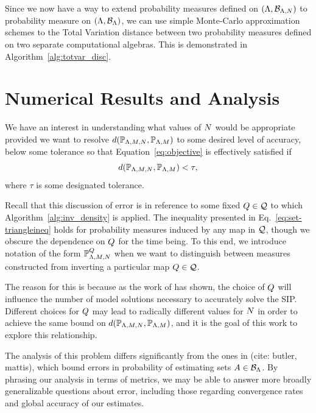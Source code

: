 Since we now have a way to extend probability measures defined on $({\Lambda}, \mathcal{B}_{{\Lambda}, N})$ to  probability measure on $({\Lambda}, \mathcal{B}_{{\Lambda}})$, we can use simple Monte-Carlo approximation schemes to the Total Variation distance between two probability measures defined on two separate computational algebras.
This is demonstrated in Algorithm~\ref{alg:totvar_disc}.



\section{Numerical Results and Analysis}\label{sec:ch03-examples}


We have an interest in understanding what values of $N$ would be appropriate provided we want to resolve $d(\mathbb{P}_{{\Lambda}, M, N}, \mathbb{P}_{{\Lambda}, M})$ to some desired level of accuracy, below some tolerance so that Equation~\eqref{eq:objective} is effectively satisfied if
\begin{equation}\label{eq:newobjective}
d(\mathbb{P}_{{\Lambda}, M, N}, \mathbb{P}_{{\Lambda},M}) < \tau,
\end{equation}
where $\tau$ is some designated tolerance.

Recall that this discussion of error is in reference to some fixed $Q\in\mathcal{Q}$ to which Algorithm~\ref{alg:inv_density} is applied.
The inequality presented in Eq.~\eqref{eq:set-triangleineq} holds for probability measures induced by any map in $\mathcal{Q}$, though we obscure the dependence on $Q$ for the time being.
To this end, we introduce notation of the form $\mathbb{P}_{{\Lambda}, M, N}^{Q}$ when we want to distinguish between measures constructed from inverting a particular map $Q\in\mathcal{Q}$.

The reason for this is because as the work of \cite{BGE+15} has shown, the choice of $Q$ will influence the number of model solutions necessary to accurately solve the SIP.
Different choices for $Q$ may lead to radically different values for $N$ in order to achieve the same bound on $d(\mathbb{P}_{{\Lambda}, M, N}, \mathbb{P}_{{\Lambda}, M})$, and it is the goal of this work to explore this relationship.

The analysis of this problem differs significantly from the ones in (cite: butler, mattis), which bound errors in probability of estimating sets $A\in\mathcal{B}_{{\Lambda}}$.
By phrasing our analysis in terms of metrics, we may be able to answer more broadly generalizable questions about error, including those regarding convergence rates and global accuracy of our estimates.






